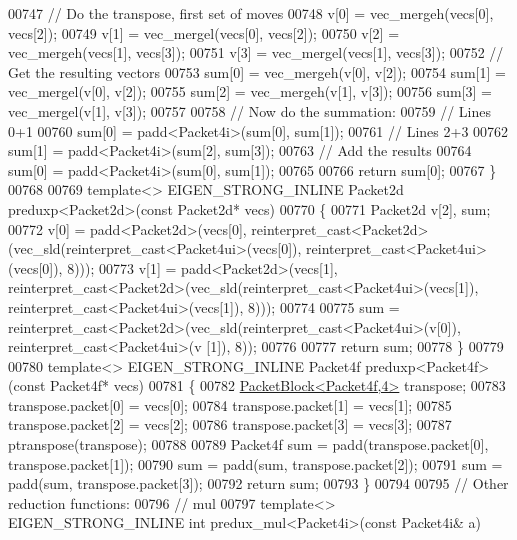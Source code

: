 \begin{DoxyCode}
{00747   \textcolor{comment}{// Do the transpose, first set of moves}
00748   v[0] = vec\_mergeh(vecs[0], vecs[2]);
00749   v[1] = vec\_mergel(vecs[0], vecs[2]);
00750   v[2] = vec\_mergeh(vecs[1], vecs[3]);
00751   v[3] = vec\_mergel(vecs[1], vecs[3]);
00752   \textcolor{comment}{// Get the resulting vectors}
00753   sum[0] = vec\_mergeh(v[0], v[2]);
00754   sum[1] = vec\_mergel(v[0], v[2]);
00755   sum[2] = vec\_mergeh(v[1], v[3]);
00756   sum[3] = vec\_mergel(v[1], v[3]);
00757 
00758   \textcolor{comment}{// Now do the summation:}
00759   \textcolor{comment}{// Lines 0+1}
00760   sum[0] = padd<Packet4i>(sum[0], sum[1]);
00761   \textcolor{comment}{// Lines 2+3}
00762   sum[1] = padd<Packet4i>(sum[2], sum[3]);
00763   \textcolor{comment}{// Add the results}
00764   sum[0] = padd<Packet4i>(sum[0], sum[1]);
00765 
00766   \textcolor{keywordflow}{return} sum[0];
00767 \}
00768 
00769 \textcolor{keyword}{template}<> EIGEN\_STRONG\_INLINE Packet2d preduxp<Packet2d>(\textcolor{keyword}{const} Packet2d* vecs)
00770 \{
00771   Packet2d v[2], sum;
00772   v[0] = padd<Packet2d>(vecs[0], \textcolor{keyword}{reinterpret\_cast<}Packet2d\textcolor{keyword}{>}(vec\_sld(reinterpret\_cast<Packet4ui>(vecs[0]), 
      reinterpret\_cast<Packet4ui>(vecs[0]), 8)));
00773   v[1] = padd<Packet2d>(vecs[1], \textcolor{keyword}{reinterpret\_cast<}Packet2d\textcolor{keyword}{>}(vec\_sld(reinterpret\_cast<Packet4ui>(vecs[1]), 
      reinterpret\_cast<Packet4ui>(vecs[1]), 8)));
00774  
00775   sum = \textcolor{keyword}{reinterpret\_cast<}Packet2d\textcolor{keyword}{>}(vec\_sld(reinterpret\_cast<Packet4ui>(v[0]), reinterpret\_cast<Packet4ui>(v
      [1]), 8));
00776 
00777   \textcolor{keywordflow}{return} sum;
00778 \}
00779 
00780 \textcolor{keyword}{template}<> EIGEN\_STRONG\_INLINE Packet4f preduxp<Packet4f>(\textcolor{keyword}{const} Packet4f* vecs)
00781 \{
00782   \hyperlink{struct_eigen_1_1internal_1_1_packet_block}{PacketBlock<Packet4f,4>} transpose;
00783   transpose.packet[0] = vecs[0];
00784   transpose.packet[1] = vecs[1];
00785   transpose.packet[2] = vecs[2];
00786   transpose.packet[3] = vecs[3];
00787   ptranspose(transpose);
00788 
00789   Packet4f sum = padd(transpose.packet[0], transpose.packet[1]);
00790   sum = padd(sum, transpose.packet[2]);
00791   sum = padd(sum, transpose.packet[3]);
00792   \textcolor{keywordflow}{return} sum;
00793 \}
00794 
00795 \textcolor{comment}{// Other reduction functions:}
00796 \textcolor{comment}{// mul}
00797 \textcolor{keyword}{template}<> EIGEN\_STRONG\_INLINE \textcolor{keywordtype}{int} predux\_mul<Packet4i>(\textcolor{keyword}{const} Packet4i& a)
}
\end{DoxyCode}
